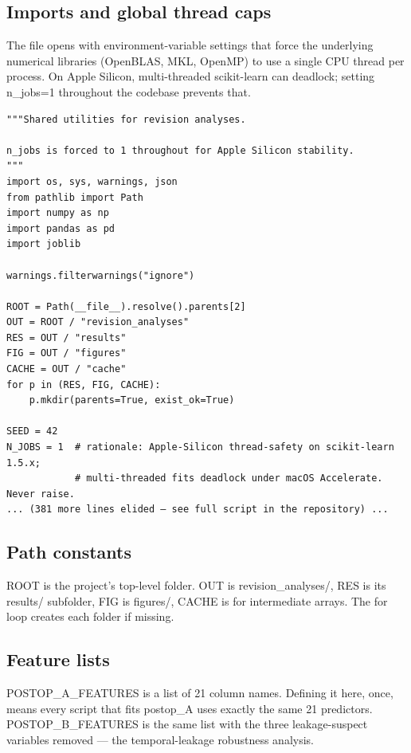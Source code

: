 \documentclass[11pt,a4paper]{article}
\begin{document}
\subsection{Imports and global thread caps}
The file opens with environment-variable settings that force the underlying numerical libraries (OpenBLAS, MKL, OpenMP) to use a single CPU thread per process. On Apple Silicon, multi-threaded scikit-learn can deadlock; setting n\_jobs=1 throughout the codebase prevents that.

\begin{lstlisting}[style=codeblock]
"""Shared utilities for revision analyses.

n_jobs is forced to 1 throughout for Apple Silicon stability.
"""
import os, sys, warnings, json
from pathlib import Path
import numpy as np
import pandas as pd
import joblib

warnings.filterwarnings("ignore")

ROOT = Path(__file__).resolve().parents[2]
OUT = ROOT / "revision_analyses"
RES = OUT / "results"
FIG = OUT / "figures"
CACHE = OUT / "cache"
for p in (RES, FIG, CACHE):
    p.mkdir(parents=True, exist_ok=True)

SEED = 42
N_JOBS = 1  # rationale: Apple-Silicon thread-safety on scikit-learn 1.5.x;
            # multi-threaded fits deadlock under macOS Accelerate.  Never raise.
... (381 more lines elided — see full script in the repository) ...
\end{lstlisting}

\subsection{Path constants}
ROOT is the project's top-level folder. OUT is revision\_analyses/, RES is its results/ subfolder, FIG is figures/, CACHE is for intermediate arrays. The for loop creates each folder if missing.
\subsection{Feature lists}
POSTOP\_A\_FEATURES is a list of 21 column names. Defining it here, once, means every script that fits postop\_A uses exactly the same 21 predictors. POSTOP\_B\_FEATURES is the same list with the three leakage-suspect variables removed --- the temporal-leakage robustness analysis.
\end{document}
